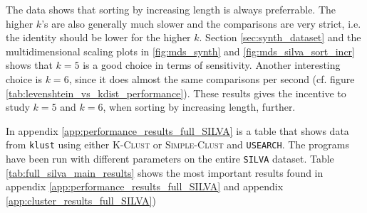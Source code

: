 The data shows that sorting by increasing length is always preferrable. The
higher $k$'s are also generally much slower and the comparisons are very
strict, i.e. the identity should be lower for the higher $k$. Section
\ref{sec:synth_dataset} and the multidimensional scaling plots in
\ref{fig:mds_synth} and \ref{fig:mds_silva_sort_incr} shows that $k=5$ is a good choice in terms of sensitivity.
Another interesting choice is $k=6$, since it does almost the same comparisons
per second (cf. figure \ref{tab:levenshtein_vs_kdist_performance}). These
results gives the incentive to study $k=5$ and $k=6$, when sorting by
increasing length, further.

In appendix \ref{app:performance_results_full_SILVA} is a table that shows
data from \texttt{klust} using either \textsc{K-Clust} or \textsc{Simple-Clust} and
\texttt{USEARCH}. The programs have been run with different parameters on the
entire \texttt{SILVA} dataset. Table
\ref{tab:full_silva_main_results} shows the most important results
found in appendix \ref{app:performance_results_full_SILVA} and appendix \ref{app:cluster_results_full_SILVA})


